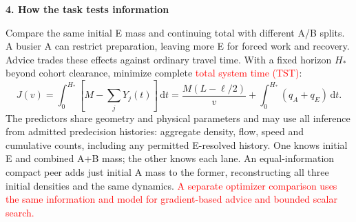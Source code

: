 \documentclass[10pt,a4paper]{article}
\newcommand{\dd}{\,\mathrm d}
\newcommand{\head}[1]{\par\vspace{4pt}\noindent\textbf{#1}\par\nobreak\vspace{1pt}}
\newcommand{\rev}[1]{\textcolor{red}{#1}}
\begin{document}
\head{4. How the task tests information}
Compare the same initial E mass and continuing total with different A/B
splits. A busier A can restrict preparation, leaving more E for forced work
and recovery. Advice trades these effects against ordinary travel time.
With a fixed horizon $H_*$ beyond cohort clearance, minimize complete
\rev{total system time (TST)}:
\begin{equation}
 J(v)=\int_0^{H_*}\!\left[M-\sum_jY_j(t)\right]\dd t
 =\frac{M(L-\ell/2)}v+\int_0^{H_*}(q_A+q_E)\dd t.
 \label{eq:objective}
\end{equation}
The predictors share geometry and physical parameters and may use all
inference from admitted predecision histories: aggregate density, flow,
speed and cumulative counts, including any permitted E-resolved history.
One knows initial E and combined A+B mass; the other knows each lane.
An equal-information compact peer adds just initial A mass to the former,
reconstructing all three initial densities and the same dynamics.
\rev{A separate optimizer comparison uses the same information and model
for gradient-based advice and bounded scalar search.}
\end{document}
